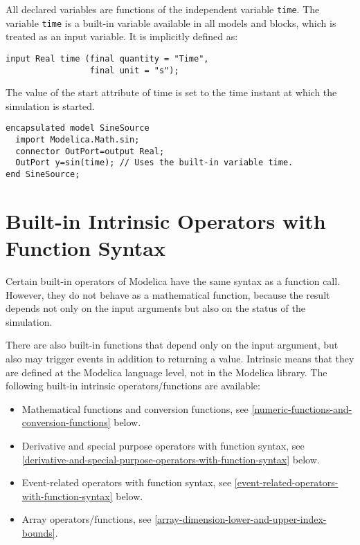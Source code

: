 All declared variables are functions of the independent variable \lstinline!time!.
The variable \lstinline!time! is a built-in variable available in all models and
blocks, which is treated as an input variable. It is implicitly defined
as:
\begin{lstlisting}[language=modelica]
input Real time (final quantity = "Time",
                 final unit = "s");
\end{lstlisting}

The value of the start attribute of time is set to the time instant at
which the simulation is started.

\begin{example}
\begin{lstlisting}[language=modelica]
encapsulated model SineSource
  import Modelica.Math.sin;
  connector OutPort=output Real;
  OutPort y=sin(time); // Uses the built-in variable time.
end SineSource;
\end{lstlisting}
\end{example}

\section{Built-in Intrinsic Operators with Function Syntax}\label{built-in-intrinsic-operators-with-function-syntax}

Certain built-in operators of Modelica have the same syntax as a
function call. However, they do not behave as a mathematical function,
because the result depends not only on the input arguments but also on
the status of the simulation.

There are also built-in functions that depend only on the input
argument, but also may trigger events in addition to returning a value.
Intrinsic means that they are defined at the Modelica language level,
not in the Modelica library. The following built-in intrinsic
operators/functions are available:
\begin{itemize}
\item
  Mathematical functions and conversion functions, see \cref{numeric-functions-and-conversion-functions}
  below.
\item
  Derivative and special purpose operators with function syntax, see
  \cref{derivative-and-special-purpose-operators-with-function-syntax} below.
\item
  Event-related operators with function syntax, see \cref{event-related-operators-with-function-syntax} below.
\item
  Array operators/functions, see \cref{array-dimension-lower-and-upper-index-bounds}.
\end{itemize}

